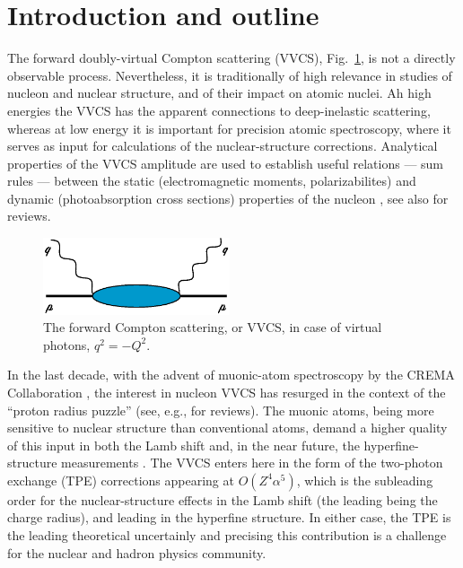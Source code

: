 \documentclass[12pt,preprint,tightenlines,
showpacs,preprintnumbers,amsmath,amssymb,
a4paper,nofootinbib]{revtex4-1}
\def\Figref#1{Fig.~\ref{fig:#1}}
\def\al{\alpha}
\begin{document}
\tableofcontents

\newpage
\section{Introduction and outline}


The forward doubly-virtual 
Compton scattering (VVCS), \Figref{CSgeneric}, is not a directly observable process. Nevertheless, it 
is traditionally of high relevance in studies
of nucleon and nuclear structure, and of their impact on atomic nuclei. Ah high energies
the VVCS has the  apparent connections to deep-inelastic scattering, whereas 
at low energy it is important for precision atomic spectroscopy, where it serves as input for calculations of the nuclear-structure corrections. Analytical properties of the VVCS amplitude
are used to establish useful relations --- sum rules ---
between the static 
(electromagnetic moments, polarizabilites) 
and dynamic (photoabsorption cross sections) properties of the nucleon \cite{GellMann:1954db,Burkhardt:1970ti,Schwinger:1975uq,Bernabeu:1974mb,Lvov:1998vg},
see also \cite{Drechsel:2002ar,Kuhn:2008sy,Holstein:2013kia,Hagelstein:2015egb,Pascalutsa:2018ced,Pasquini:2018wbl} for reviews. 

\begin{figure}[bht]
\centering
       \includegraphics[width=5.5cm]{frwCSgeneric.eps}
\caption{The forward Compton scattering, or VVCS, in case of virtual photons, $q^2=-Q^2$.
  \label{fig:CSgeneric}}
\end{figure}

In the last decade, with the advent of muonic-atom spectroscopy
by the CREMA Collaboration \cite{Pohl:2010zza,Antognini:1900ns,Pohl1:2016xoo},
the interest in nucleon VVCS has resurged in the context of 
the  ``proton radius puzzle'' (see, e.g.,  \cite{Pohl:2013yb,Carlson:2015jba} for reviews).  
The muonic atoms, being more sensitive to nuclear structure than
conventional atoms, demand a higher quality of this input
in both the Lamb shift \cite{Pohl:2010zza,Antognini:1900ns} and, in the near future, the hyperfine-structure measurements  \cite{Pohl:2016xsr,Bakalov:2015xya,Kanda:2018oay}. The VVCS  enters here in the form of the two-photon exchange (TPE) corrections appearing at $O(Z^4\al^5)$, which is the subleading order for the nuclear-structure effects in the Lamb shift (the leading  being the  charge radius), and leading in the hyperfine structure. In either case, the TPE is the leading theoretical uncertainly and precising this contribution is a challenge for the nuclear and hadron
physics community.
\end{document}
